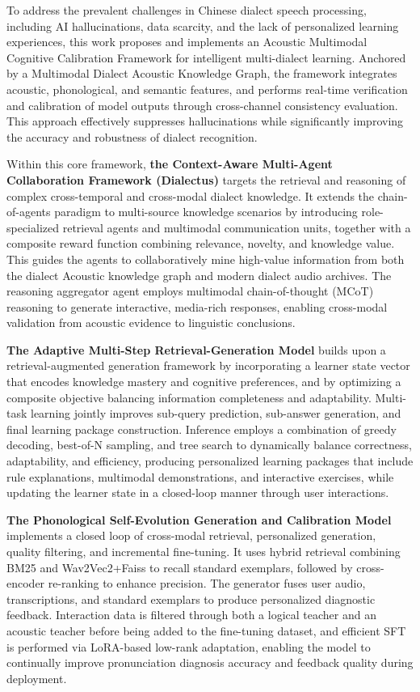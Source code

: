 \begin{abstract*}
To address the prevalent challenges in Chinese dialect speech processing, including AI hallucinations, data scarcity, and the lack of personalized learning experiences, this work proposes and implements an Acoustic Multimodal Cognitive Calibration Framework for intelligent multi-dialect learning. Anchored by a Multimodal Dialect Acoustic Knowledge Graph, the framework integrates acoustic, phonological, and semantic features, and performs real-time verification and calibration of model outputs through cross-channel consistency evaluation. This approach effectively suppresses hallucinations while significantly improving the accuracy and robustness of dialect recognition.

Within this core framework, \textbf{the Context-Aware Multi-Agent Collaboration Framework (Dialectus)} targets the retrieval and reasoning of complex cross-temporal and cross-modal dialect knowledge. It extends the chain-of-agents paradigm to multi-source knowledge scenarios by introducing role-specialized retrieval agents and multimodal communication units, together with a composite reward function combining relevance, novelty, and knowledge value. This guides the agents to collaboratively mine high-value information from both the dialect Acoustic knowledge graph and modern dialect audio archives. The reasoning aggregator agent employs multimodal chain-of-thought (MCoT) reasoning to generate interactive, media-rich responses, enabling cross-modal validation from acoustic evidence to linguistic conclusions.

\textbf{The Adaptive Multi-Step Retrieval-Generation Model} builds upon a retrieval-augmented generation framework by incorporating a learner state vector that encodes knowledge mastery and cognitive preferences, and by optimizing a composite objective balancing information completeness and adaptability. Multi-task learning jointly improves sub-query prediction, sub-answer generation, and final learning package construction. Inference employs a combination of greedy decoding, best-of-N sampling, and tree search to dynamically balance correctness, adaptability, and efficiency, producing personalized learning packages that include rule explanations, multimodal demonstrations, and interactive exercises, while updating the learner state in a closed-loop manner through user interactions.

\textbf{The Phonological Self-Evolution Generation and Calibration Model} implements a closed loop of cross-modal retrieval, personalized generation, quality filtering, and incremental fine-tuning. It uses hybrid retrieval combining BM25 and Wav2Vec2+Faiss to recall standard exemplars, followed by cross-encoder re-ranking to enhance precision. The generator fuses user audio, transcriptions, and standard exemplars to produce personalized diagnostic feedback. Interaction data is filtered through both a logical teacher and an acoustic teacher before being added to the fine-tuning dataset, and efficient SFT is performed via LoRA-based low-rank adaptation, enabling the model to continually improve pronunciation diagnosis accuracy and feedback quality during deployment.


\end{abstract*}
